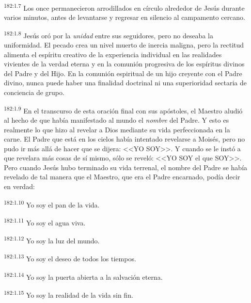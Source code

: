 \par 
\textsuperscript{182:1.7} Los once permanecieron arrodillados en círculo alrededor de Jesús durante varios minutos, antes de levantarse y regresar en silencio al campamento cercano.

\par 
\textsuperscript{182:1.8} Jesús oró por la \textit{unidad} entre sus seguidores, pero no deseaba la uniformidad. El pecado crea un nivel muerto de inercia maligna, pero la rectitud alimenta el espíritu creativo de la experiencia individual en las realidades vivientes de la verdad eterna y en la comunión progresiva de los espíritus divinos del Padre y del Hijo. En la comunión espiritual de un hijo creyente con el Padre divino, nunca puede haber una finalidad doctrinal ni una superioridad sectaria de conciencia de grupo.

\par 
\textsuperscript{182:1.9} En el transcurso de esta oración final con sus apóstoles, el Maestro aludió al hecho de que había manifestado al mundo el \textit{nombre} del Padre. Y esto es realmente lo que hizo al revelar a Dios mediante su vida perfeccionada en la carne. El Padre que está en los cielos había intentado revelarse a Moisés, pero no pudo ir más allá de hacer que se dijera: <<YO SOY>>. Y cuando se le instó a que revelara más cosas de sí mismo, sólo se reveló: <<YO SOY el que SOY>>. Pero cuando Jesús hubo terminado su vida terrenal, el nombre del Padre se había revelado de tal manera que el Maestro, que era el Padre encarnado, podía decir en verdad:

\par 
\textsuperscript{182:1.10} Yo soy el pan de la vida.

\par 
\textsuperscript{182:1.11} Yo soy el agua viva.

\par 
\textsuperscript{182:1.12} Yo soy la luz del mundo.

\par 
\textsuperscript{182:1.13} Yo soy el deseo de todos los tiempos.

\par 
\textsuperscript{182:1.14} Yo soy la puerta abierta a la salvación eterna.

\par 
\textsuperscript{182:1.15} Yo soy la realidad de la vida sin fin.

